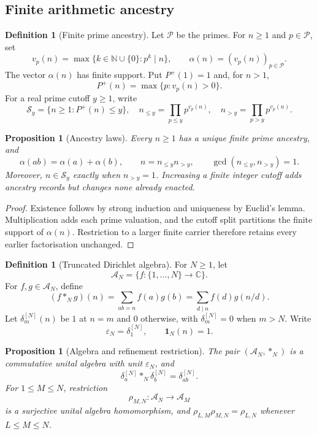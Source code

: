 \documentclass[11pt,a4paper]{article}
\newtheorem{proposition}[theorem]{Proposition}
\theoremstyle{definition}
\newtheorem{definition}[theorem]{Definition}
\newcommand{\N}{\mathbb{N}}
\newcommand{\C}{\mathbb{C}}
\newcommand{\DirichletAlg}{\mathscr{A}}
\begin{document}
\subsection{Finite arithmetic ancestry}

\begin{definition}[Finite prime ancestry]
\label{def:finite-prime-ancestry}
Let $\mathcal P$ be the primes. For $n\geq1$ and $p\in\mathcal P$, set
\[
  v_p(n)=\max\{k\in\N\cup\{0\}:p^k\mid n\},
  \qquad
  \alpha(n)=(v_p(n))_{p\in\mathcal P}.
\]
The vector $\alpha(n)$ has finite support. Put $P^+(1)=1$ and, for $n>1$,
\[
  P^+(n)=\max\{p:v_p(n)>0\}.
\]
For a real prime cutoff $y\geq1$, write
\[
  \mathcal S_y=\{n\geq1:P^+(n)\leq y\},
  \quad
  n_{\leq y}=\prod_{p\leq y}p^{v_p(n)},
  \quad
  n_{>y}=\prod_{p>y}p^{v_p(n)}.
\]
\end{definition}

\begin{proposition}[Ancestry laws]
\label{prop:finite-ancestry-laws}
Every $n\geq1$ has a unique finite prime ancestry, and
\[
  \alpha(ab)=\alpha(a)+\alpha(b),
  \qquad
  n=n_{\leq y}n_{>y},
  \qquad
  \gcd(n_{\leq y},n_{>y})=1.
\]
Moreover, $n\in\mathcal S_y$ exactly when $n_{>y}=1$. Increasing a finite
integer cutoff adds ancestry records but changes none already enacted.
\end{proposition}

\begin{proof}
Existence follows by strong induction and uniqueness by Euclid's lemma.
Multiplication adds each prime valuation, and the cutoff split partitions the
finite support of $\alpha(n)$. Restriction to a larger finite carrier therefore
retains every earlier factorisation unchanged.
\end{proof}

\begin{definition}[Truncated Dirichlet algebra]
\label{def:truncated-dirichlet-algebra}
For $N\geq1$, let
\[
  \DirichletAlg_N=\{f:\{1,\ldots,N\}\to\C\}.
\]
For $f,g\in\DirichletAlg_N$, define
\[
  (f*_Ng)(n)
  =\sum_{ab=n}f(a)g(b)
  =\sum_{d\mid n}f(d)g(n/d).
\]
Let $\delta_m^{[N]}(n)$ be $1$ at $n=m$ and $0$ otherwise, with
$\delta_m^{[N]}=0$ when $m>N$. Write
\[
  \varepsilon_N=\delta_1^{[N]},
  \qquad
  \mathbf1_N(n)=1.
\]
\end{definition}

\begin{proposition}[Algebra and refinement restriction]
\label{prop:truncated-algebra-restriction}
The pair $(\DirichletAlg_N,*_N)$ is a commutative unital algebra with unit
$\varepsilon_N$, and
\[
  \delta_a^{[N]}*_N\delta_b^{[N]}=\delta_{ab}^{[N]}.
\]
For $1\leq M\leq N$, restriction
\[
  \rho_{M,N}:\DirichletAlg_N\to\DirichletAlg_M
\]
is a surjective unital algebra homomorphism, and
$\rho_{L,M}\rho_{M,N}=\rho_{L,N}$ whenever $L\leq M\leq N$.
\end{proposition}
\end{document}
